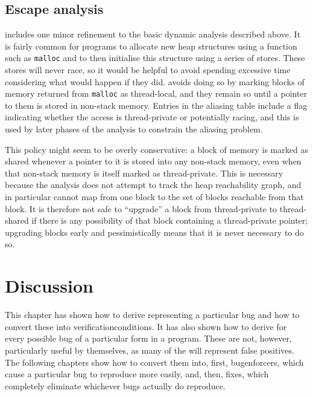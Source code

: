 \subsection{Escape analysis}
{\Implementation} includes one minor refinement to the basic dynamic
analysis described above.  It is fairly common for programs to
allocate new heap structures using a function such as \texttt{malloc}
and to then initialise this structure using a series of stores.  These
stores will never race, so it would be helpful to avoid spending
excessive time considering what would happen if they did.
{\Technique} avoids doing so by marking blocks of memory returned from
\texttt{malloc} as thread-local, and they remain so until a pointer to
them is stored in non-stack memory.  Entries in the aliasing table
include a flag indicating whether the access is thread-private or
potentially racing, and this is used by later phases of the analysis
to constrain the aliasing problem.

This policy might seem to be overly conservative: a block of memory is
marked as shared whenever a pointer to it is stored into any non-stack
memory, even when that non-stack memory is itself marked as
thread-private.  This is necessary because the analysis does not
attempt to track the heap reachability graph, and in particular cannot
map from one block to the set of blocks reachable from that block.  It
is therefore not safe to ``upgrade'' a block from thread-private to
thread-shared if there is any possibility of that block containing a
thread-private pointer; upgrading blocks early and pessimistically
means that it is never necessary to do so.

\section{Discussion}

This chapter has shown how to derive {\StateMachines} representing a
particular bug and how to convert these into
\glspl{verificationcondition}.  It has also shown how to derive
      {\StateMachines} for every possible bug of a particular form in
      a program.  These are not, however, particularly useful by
      themselves, as many of the {\StateMachines} will represent false
      positives.  The following chapters show how to convert them
      into, first, \glspl{bugenforcer}, which cause a particular bug
      to reproduce more easily, and, then, fixes, which completely
      eliminate whichever bugs actually do reproduce.
